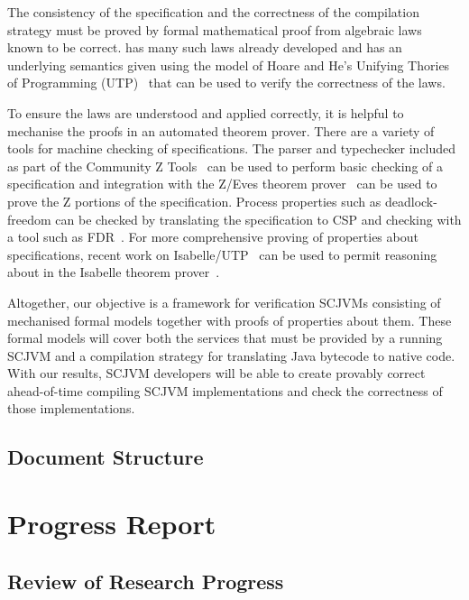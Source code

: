 \documentclass[a4paper,10pt]{report}
\begin{document}
The consistency of the specification and the correctness of the
compilation strategy must be proved by formal mathematical proof from
algebraic laws known to be correct.
\Circus{} has many such laws already developed and has an underlying
semantics given using the model of Hoare and He's Unifying Thories of
Programming (UTP)~\cite{hoare1998} that can be used to verify the
correctness of the laws.

To ensure the laws are understood and applied correctly, it is helpful
to mechanise the proofs in an automated theorem prover.
There are a variety of tools for machine checking of \Circus{}
specifications.
The \Circus{} parser and typechecker included as part of the Community
Z Tools~\cite{malik2011, xavier2008, malik2005, miller2005} can be
used to perform basic checking of a \Circus{} specification and
integration with the Z/Eves theorem prover~\cite{saaltink1997} can be
used to prove the Z portions of the \Circus{} specification.
Process properties such as deadlock-freedom can be checked by
translating the \Circus{} specification to CSP and checking with a
tool such as FDR~\cite{gibson-robinson2014}.
For more comprehensive proving of properties about \Circus{}
specifications, recent work on Isabelle/UTP~\cite{foster2015} can be
used to permit reasoning about \Circus{} in the Isabelle theorem
prover~\cite{nipkow2002}.

Altogether, our objective is a framework for verification SCJVMs
consisting of mechanised formal models together with proofs of
properties about them.
These formal models will cover both the services that must be provided
by a running SCJVM and a compilation strategy for translating Java
bytecode to native code.
With our results, SCJVM developers will be able to create provably
correct ahead-of-time compiling SCJVM implementations and check the
correctness of those implementations.


\section{Document Structure}

\chapter{Progress Report}

\section{Review of Research Progress}
\end{document}
